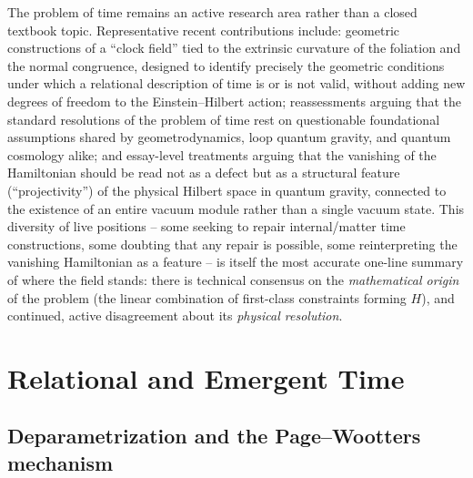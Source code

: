 \documentclass[11pt]{article}
\begin{document}
The problem of time remains an active research area rather than a closed textbook topic. Representative recent contributions include: geometric constructions of a ``clock field'' tied to the extrinsic curvature of the foliation and the normal congruence, designed to identify precisely the geometric conditions under which a relational description of time is or is not valid, without adding new degrees of freedom to the Einstein--Hilbert action; reassessments arguing that the standard resolutions of the problem of time rest on questionable foundational assumptions shared by geometrodynamics, loop quantum gravity, and quantum cosmology alike; and essay-level treatments arguing that the vanishing of the Hamiltonian should be read not as a defect but as a structural feature (``projectivity'') of the physical Hilbert space in quantum gravity, connected to the existence of an entire vacuum module rather than a single vacuum state. This diversity of live positions -- some seeking to repair internal/matter time constructions, some doubting that any repair is possible, some reinterpreting the vanishing Hamiltonian as a feature -- is itself the most accurate one-line summary of where the field stands: there is technical consensus on the \emph{mathematical origin} of the problem (the linear combination of first-class constraints forming $H$), and continued, active disagreement about its \emph{physical resolution}.

\section{Relational and Emergent Time}
\label{sec:relational}

\subsection{Deparametrization and the Page--Wootters mechanism}
\end{document}
